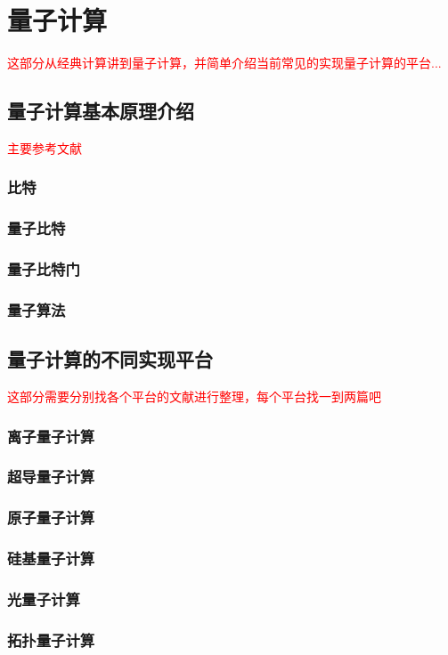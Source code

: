 
\chapter[量子计算]{量子计算}
\textcolor{red}{
这部分从经典计算讲到量子计算，并简单介绍当前常见的实现量子计算的平台... 
}
\section[量子计算基本原理介绍]{量子计算基本原理介绍}
\textcolor{red}{主要参考文献\cite[]{Williams2011}}
\subsection[比特]{比特}

\subsection[量子比特]{量子比特}

\subsection[量子比特门]{量子比特门}

\subsection[量子算法]{量子算法}









\section[量子计算的不同实现平台]{量子计算的不同实现平台}
\textcolor{red}{这部分需要分别找各个平台的文献进行整理，每个平台找一到两篇吧}
\subsection[离子量子计算]{离子量子计算}

\subsection[超导量子计算]{超导量子计算}

\subsection[原子量子计算]{原子量子计算}

\subsection[硅基量子计算]{硅基量子计算}

\subsection[光量子计算]{光量子计算}

\subsection[拓扑量子计算]{拓扑量子计算}







